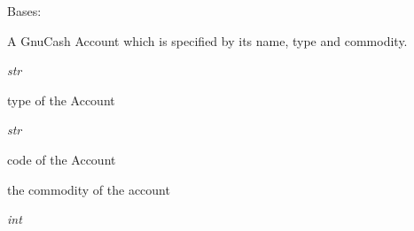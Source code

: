 \documentclass[letterpaper,10pt,english]{sphinxmanual}
\begin{document}
\begin{fulllineitems}
\label{api/piecash.model_core.account:piecash.model_core.account.Account}
Bases: 

A GnuCash Account which is specified by its name, type and commodity.

\begin{fulllineitems}
\label{api/piecash.model_core.account:piecash.model_core.account.Account.account_type}
\emph{str}

type of the Account

\end{fulllineitems}


\begin{fulllineitems}
\label{api/piecash.model_core.account:piecash.model_core.account.Account.code}
\emph{str}

code of the Account

\end{fulllineitems}


\begin{fulllineitems}
\label{api/piecash.model_core.account:piecash.model_core.account.Account.commodity}
{\hyperref[api/piecash.model_core.commodity:piecash.model_core.commodity.Commodity]{}}

the commodity of the account

\end{fulllineitems}


\begin{fulllineitems}
\label{api/piecash.model_core.account:piecash.model_core.account.Account.commodity_scu}
\emph{int}


\end{fulllineitems}
\end{fulllineitems}
\end{document}

